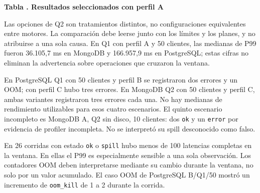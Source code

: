 \documentclass[12pt,letterpaper]{article}
\begin{document}
\par\begin{minipage}{\textwidth}\begin{center}\textbf{Tabla \thetable. Resultados seleccionados con perfil A}\par\small{}\end{center}\end{minipage}
Las opciones de Q2 son tratamientos distintos, no configuraciones equivalentes entre motores. La comparación debe leerse junto con los límites y los planes, y no atribuirse a una sola causa. En Q1 con perfil A y 50 clientes, las medianas de P99 fueron 36.105,7 ms en MongoDB y 166.957,9 ms en PostgreSQL; estas cifras no eliminan la advertencia sobre operaciones que cruzaron la ventana.

En PostgreSQL Q1 con 50 clientes y perfil B se registraron dos errores y un OOM; con perfil C hubo tres errores. En MongoDB Q2 con 50 clientes y perfil C, ambas variantes registraron tres errores cada una. No hay medianas de rendimiento utilizables para esos cuatro escenarios. El quinto escenario incompleto es MongoDB A, Q2 sin disco, 10 clientes: dos \texttt{ok} y un \texttt{error} por evidencia de profiler incompleta. No se interpretó su spill desconocido como falso.

En 26 corridas con estado \texttt{ok} o \texttt{spill} hubo menos de 100 latencias completas en la ventana. En ellas el P99 es especialmente sensible a una sola observación. Los contadores OOM deben interpretarse mediante su cambio durante la ventana, no solo por un valor acumulado. El caso OOM de PostgreSQL B/Q1/50 mostró un incremento de \texttt{oom\_\allowbreak{}kill} de 1 a 2 durante la corrida.
\end{document}
